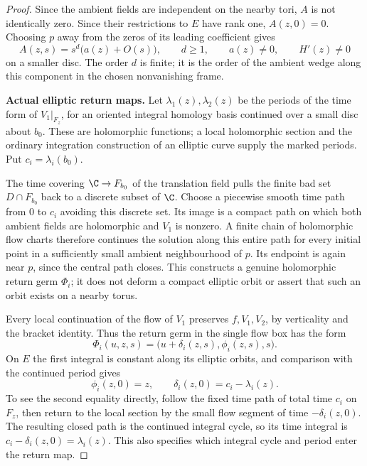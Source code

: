 \begin{proof}
Since the ambient fields are independent on the nearby
tori, $A$ is not identically zero. Since their restrictions
to $E$ have rank one, $A(z,0)=0$. Choosing $p$ away
from the zeros of its leading coefficient gives
\[
 A(z,s)=s^d\bigl(a(z)+O(s)\bigr),\qquad d\ge1,
 \qquad a(z)\ne0,\qquad H'(z)\ne0
                                                               \tag{C.RG.5}\label{cdp:eq:C.RG.5}
\]
on a smaller disc. The order $d$ is finite; it is the
order of the ambient wedge along this component in the
chosen nonvanishing frame.

\par\medskip\noindent\textbf{Actual elliptic return maps.}
Let $\lambda_1(z),\lambda_2(z)$ be the periods of the
time form of $V_1|_{F_z}$, for an oriented integral
homology basis continued over a small disc about $b_0$.
These are holomorphic functions; a local holomorphic
section and the ordinary integration construction of
an elliptic curve supply the marked periods. Put
$c_i=\lambda_i(b_0)$.

The time covering $\C\to F_{b_0}$ of the translation
field pulls the finite bad set $D\cap F_{b_0}$ back to
a discrete subset of $\C$. Choose a piecewise smooth
time path from $0$ to $c_i$ avoiding this discrete set.
Its image is a compact path on which both ambient fields
are holomorphic and $V_1$ is nonzero. A finite chain of
holomorphic flow charts therefore continues the solution
along this entire path for every initial point in a
sufficiently small ambient neighbourhood of $p$.
Its endpoint is again near $p$, since the central path
closes. This constructs a genuine holomorphic return
germ $\Phi_i$; it does not deform a compact elliptic
orbit or assert that such an orbit exists on a nearby
torus.

Every local continuation of the flow of $V_1$ preserves
$f,V_1,V_2$, by verticality and the bracket identity.
Thus the return germ in the single flow box has the form
\[
 \Phi_i(u,z,s)=\bigl(u+\delta_i(z,s),\phi_i(z,s),s\bigr).
                                                               \tag{C.RG.6}\label{cdp:eq:C.RG.6}
\]
On $E$ the first integral is constant along its elliptic
orbits, and comparison with the continued period gives
\[
 \phi_i(z,0)=z,\qquad
 \delta_i(z,0)=c_i-\lambda_i(z).
                                                               \tag{C.RG.7}\label{cdp:eq:C.RG.7}
\]
To see the second equality directly, follow the fixed
time path of total time $c_i$ on $F_z$, then return
to the local section by the small flow segment of
time $-\delta_i(z,0)$. The resulting closed path is
the continued integral cycle, so its time integral is
$c_i-\delta_i(z,0)=\lambda_i(z)$. This also specifies
which integral cycle and period enter the return map.


\end{proof}
